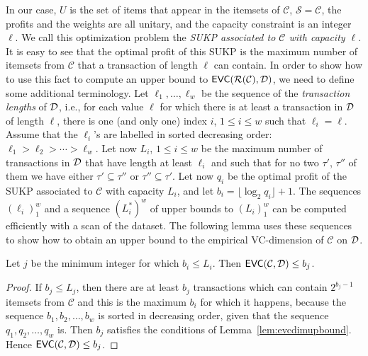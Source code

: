In our case, $U$ is the set of items that appear in the itemsets of
$\mathcal{C}$, $\mathcal{S}=\mathcal{C}$, the profits and the weights are all
unitary, and the capacity constraint is an integer $\ell$. We call this
optimization problem the \emph{SUKP associated to $\mathcal{C}$ with capacity
$\ell$}.
It is easy to see %
that the optimal profit of this SUKP is the maximum number
of itemsets from $\mathcal{C}$ that a transaction of length $\ell$ can contain.  %
In order to show how to use this fact to compute an upper bound to
$\mathsf{EVC}(\mathcal{R}(\mathcal{C}),{\cal D})$, we need to define some additional terminology. Let
$\ell_1,\dotsc,\ell_w$ be the sequence of the
\emph{transaction lengths} of ${\cal D}$, i.e., for each value $\ell$
for which there is at least a transaction in ${\cal D}$ of length $\ell$, there is
one (and only one) index $i$, $1\le i\le w$ such that $\ell_i=\ell$. Assume that
the $\ell_i$'s are labelled in sorted decreasing order:
$\ell_1>\ell_2>\dotsb>\ell_w$. Let now $L_i$, $1\le i\le w$ be the maximum number of
transactions in ${\cal D}$ that have length at least $\ell_i$ and such that
for no two $\tau'$, $\tau''$ of them we have either $\tau'\subseteq\tau''$ or
$\tau''\subseteq\tau'$. Let now $q_i$ be the optimal profit of the SUKP associated to
$\mathcal{C}$ with capacity $L_i$, and let $b_i=\lfloor \log_2q_i\rfloor +1$.
The sequences $(\ell_i)_1^w$ and a sequence $(L_i^*)^w$ of upper bounds to
$(L_i)_1^w$ can be computed efficiently with a scan of the dataset.
The following lemma uses these sequences to show how to obtain an upper bound to
the empirical VC-dimension of $\mathcal{C}$ on ${\cal D}$.

\begin{lemma}\label{lem:sukpevc}
  Let $j$ be the minimum integer for which $b_i\le L_i$. Then
  $\mathsf{EVC}(\mathcal{C},{\cal D})\le b_j$. %
\end{lemma}
\begin{proof}
  If $b_j\le L_j$, then there are at least $b_j$ transactions which can contain
  $2^{b_j-1}$ itemsets from $\mathcal{C}$ and this is the maximum $b_i$ for
  which it happens, because the sequence $b_1,b_2,\dotsc,b_w$ is sorted in
  decreasing order, given that the sequence $q_1,q_2,\dotsc,q_w$ is. Then $b_j$
  satisfies the conditions of Lemma~\ref{lem:evcdimupbound}. Hence
  $\mathsf{EVC}(\mathcal{C},{\cal D})\le b_j$.
\end{proof}

